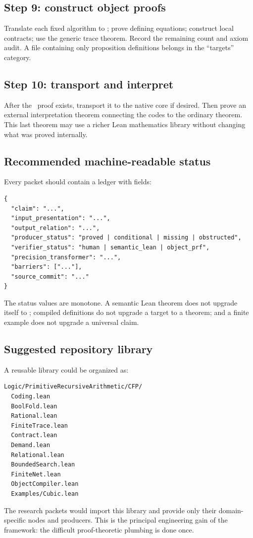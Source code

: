\subsection{Step 9: construct object proofs}

Translate each fixed algorithm to ; prove defining equations;
construct local  contracts; use the generic trace theorem.
Record the remaining  count and axiom audit.  A file containing
only proposition definitions belongs in the ``targets'' category.

\subsection{Step 10: transport and interpret}

After the \PRAAx\ proof exists, transport it to the native core if desired.
Then prove an external interpretation theorem connecting the codes to the
ordinary theorem.  This last theorem may use a richer Lean mathematics
library without changing what was proved internally.

\subsection{Recommended machine-readable status}

Every packet should contain a ledger with fields:
\begin{lstlisting}[language={}]
{
  "claim": "...",
  "input_presentation": "...",
  "output_relation": "...",
  "producer_status": "proved | conditional | missing | obstructed",
  "verifier_status": "human | semantic_lean | object_prf",
  "precision_transformer": "...",
  "barriers": ["..."],
  "source_commit": "..."
}
\end{lstlisting}

The status values are monotone.  A semantic Lean theorem does not upgrade
itself to ; compiled definitions do not upgrade a target to
a theorem; and a finite example does not upgrade a universal claim.

\subsection{Suggested repository library}

A reusable library could be organized as:
\begin{lstlisting}[language={}]
Logic/PrimitiveRecursiveArithmetic/CFP/
  Coding.lean
  BoolFold.lean
  Rational.lean
  FiniteTrace.lean
  Contract.lean
  Demand.lean
  Relational.lean
  BoundedSearch.lean
  FiniteNet.lean
  ObjectCompiler.lean
  Examples/Cubic.lean
\end{lstlisting}
The research packets would import this library and provide only their
domain-specific nodes and producers.  This is the principal engineering gain
of the framework: the difficult proof-theoretic plumbing is done once.
